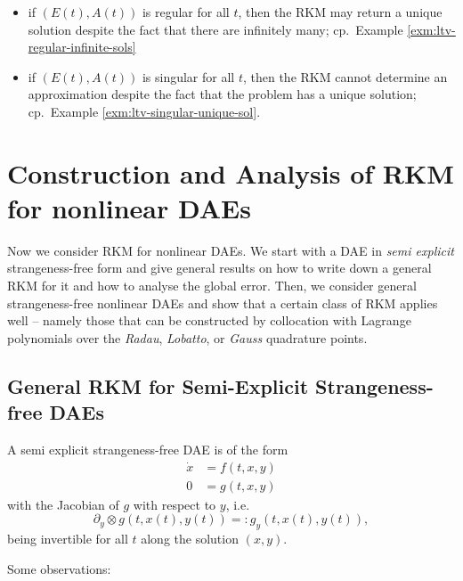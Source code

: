 \documentclass[]{book}
\providecommand{\tightlist}{%
  \setlength{\itemsep}{0pt}\setlength{\parskip}{0pt}}
\theoremstyle{definition}
\theoremstyle{definition}
\theoremstyle{definition}
\theoremstyle{definition}
\theoremstyle{remark}
\begin{document}
\begin{itemize}
\tightlist
\item
  if \((E(t), A(t))\) is regular for all \(t\), then the RKM may return a unique solution despite the fact that there are infinitely many; cp.~Example \ref{exm:ltv-regular-infinite-sols}
\item
  if \((E(t), A(t))\) is singular for all \(t\), then the RKM cannot determine an approximation despite the fact that the problem has a unique solution; cp.~Example \ref{exm:ltv-singular-unique-sol}.
\end{itemize}

\hypertarget{construction-and-analysis-of-rkm-for-nonlinear-daes}{%
\chapter{Construction and Analysis of RKM for nonlinear DAEs}\label{construction-and-analysis-of-rkm-for-nonlinear-daes}}

Now we consider RKM for nonlinear DAEs. We start with a DAE in \emph{semi explicit} strangeness-free form and give general results on how to write down a general RKM for it and how to analyse the global error. Then, we consider general strangeness-free nonlinear DAEs and show that a certain class of RKM applies well -- namely those that can be constructed by collocation with Lagrange polynomials over the \emph{Radau}, \emph{Lobatto}, or \emph{Gauss} quadrature points.

\hypertarget{general-rkm-for-semi-explicit-strangeness-free-daes}{%
\section{General RKM for Semi-Explicit Strangeness-free DAEs}\label{general-rkm-for-semi-explicit-strangeness-free-daes}}

A semi explicit strangeness-free DAE is of the form
\begin{align}
\dot x &= f(t, x, y) \label{eq:semexp-dae-diff} \\
0 &= g(t, x, y) \label{eq:semexp-dae-alg}
\end{align}
with the Jacobian of \(g\) with respect to \(y\), i.e.
\[
\partial_y\otimes g(t, x(t), y(t)) =: g_y(t, x(t), y(t)),
\]
being invertible for all \(t\) along the solution \((x,y)\).

Some observations:
\end{document}
